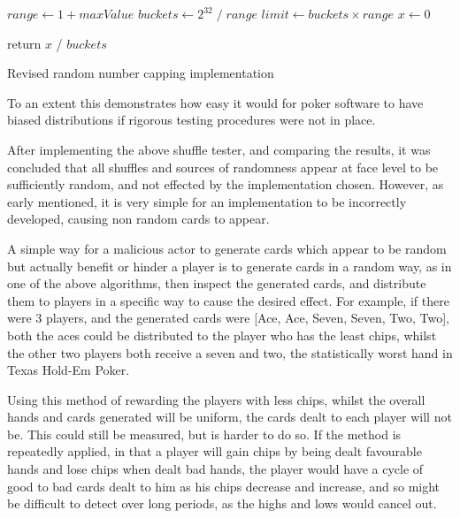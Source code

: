 \vspace{0.3cm}

\begin{algorithm}[H]
    \BlankLine{}
    $range \leftarrow 1 + maxValue$\;
    $buckets \leftarrow {2}^{32}\; / \;range$\;
    $limit \leftarrow buckets \times range$\;
    $x \leftarrow 0$\;


    return $x$ / $buckets$\;
\caption{Revised random number capping implementation}%
\label{code:rngGoodCapping}
\end{algorithm}

\vspace{0.3cm}

To an extent this demonstrates how easy it would for poker software to have
biased distributions if rigorous testing procedures were not in place.

After implementing the above shuffle tester, and comparing the results,
it was concluded that all shuffles and sources of randomness appear at face
level to be sufficiently random, and not effected by the implementation chosen.
However, as early mentioned, it is very simple for an implementation to be
incorrectly developed, causing non random cards to appear.

A simple way for a malicious actor to generate cards which appear to be random
but actually benefit or hinder a player is to generate cards in a random
way, as in one of the above algorithms, then inspect the generated cards,
and distribute them to players in a specific way to cause the desired effect.
For example, if there were 3 players, and the generated cards were
[Ace, Ace, Seven, Seven, Two, Two], both the aces could be distributed to
the player who has the least chips, whilst the other two players both receive
a seven and two, the statistically worst hand in Texas Hold-Em Poker.

Using this method of rewarding the players with less chips, whilst the overall 
hands and cards generated will be uniform, the cards dealt to each player 
will not be. This could still be measured, but is harder to do so. If the
method is repeatedly applied, in that a player will gain chips by being dealt 
favourable hands and lose chips when dealt bad hands, the player would have 
a cycle of good to bad cards dealt to him as his chips decrease and increase, 
and so might be difficult to detect over long periods, as the highs and lows 
would cancel out.

